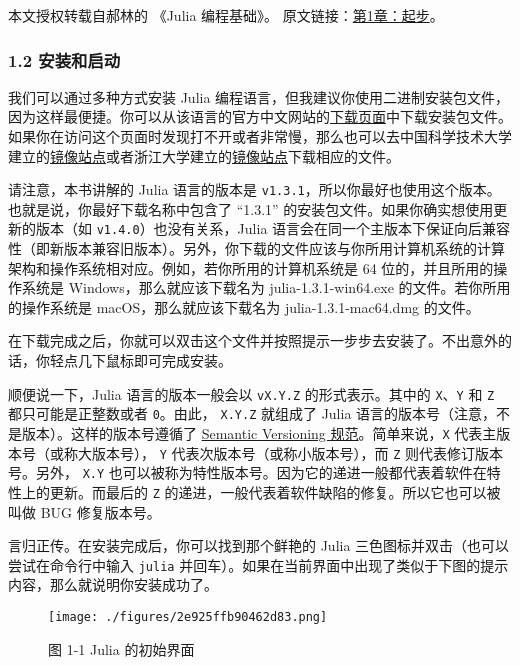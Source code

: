 
本文授权转载自郝林的 《Julia 编程基础》。 原文链接：\href{https://github.com/hyper0x/JuliaBasics/blob/master/book/ch01.md}{第1章：起步}。

\subsubsection{1.2 安装和启动}

我们可以通过多种方式安装 Julia 编程语言，但我建议你使用二进制安装包文件，因为这样最便捷。你可以从该语言的官方中文网站的\href{https://cn.julialang.org/downloads/}{下载页面}中下载安装包文件。如果你在访问这个页面时发现打不开或者非常慢，那么也可以去中国科学技术大学建立的\href{https://mirrors.zju.edu.cn/julia/releases/}{镜像站点}或者浙江大学建立的\href{https://mirrors.ustc.edu.cn/julia/releases/}{镜像站点}下载相应的文件。

请注意，本书讲解的 Julia 语言的版本是 \verb|v1.3.1|，所以你最好也使用这个版本。也就是说，你最好下载名称中包含了 “1.3.1” 的安装包文件。如果你确实想使用更新的版本（如 \verb|v1.4.0|）也没有关系，Julia 语言会在同一个主版本下保证向后兼容性（即新版本兼容旧版本）。另外，你下载的文件应该与你所用计算机系统的计算架构和操作系统相对应。例如，若你所用的计算机系统是 64 位的，并且所用的操作系统是 Windows，那么就应该下载名为 julia-1.3.1-win64.exe 的文件。若你所用的操作系统是 macOS，那么就应该下载名为 julia-1.3.1-mac64.dmg 的文件。

在下载完成之后，你就可以双击这个文件并按照提示一步步去安装了。不出意外的话，你轻点几下鼠标即可完成安装。

顺便说一下，Julia 语言的版本一般会以 \verb|vX.Y.Z| 的形式表示。其中的 \verb|X|、\verb|Y| 和 \verb|Z| 都只可能是正整数或者 \verb|0|。由此， \verb|X.Y.Z| 就组成了 Julia 语言的版本号（注意，不是版本）。这样的版本号遵循了 \href{https://semver.org}{Semantic Versioning 规范}。简单来说，\verb|X| 代表主版本号（或称大版本号）， \verb|Y| 代表次版本号（或称小版本号），而 \verb|Z| 则代表修订版本号。另外， \verb|X.Y| 也可以被称为特性版本号。因为它的递进一般都代表着软件在特性上的更新。而最后的 \verb|Z| 的递进，一般代表着软件缺陷的修复。所以它也可以被叫做 BUG 修复版本号。

言归正传。在安装完成后，你可以找到那个鲜艳的 Julia 三色图标并双击（也可以尝试在命令行中输入 \verb|julia| 并回车）。如果在当前界面中出现了类似于下图的提示内容，那么就说明你安装成功了。

\begin{figure}[ht]
\centering
\texttt{[image: ./figures/2e925ffb90462d83.png]}
\caption{图 1-1 Julia 的初始界面} \label{fig_JuC1S2_1}
\end{figure}

